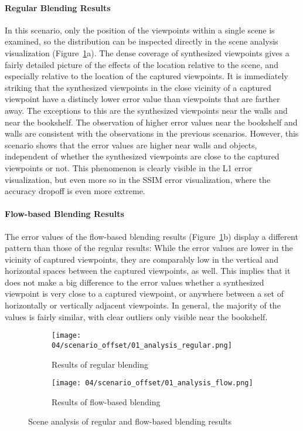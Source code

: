\paragraph{Regular Blending Results}
In this scenario, only the position of the viewpoints within a single scene is examined, so the distribution can be inspected directly in the scene analysis visualization (Figure~\ref{fig:offset_regular_flow}a). The dense coverage of synthesized viewpoints gives a fairly detailed picture of the effects of the location relative to the scene, and especially relative to the location of the captured viewpoints. It is immediately striking that the synthesized viewpoints in the close vicinity of a captured viewpoint have a distincly lower error value than viewpoints that are farther away. The exceptions to this are the synthesized viewpoints near the walls and near the bookshelf. The observation of higher error values near the bookshelf and walls are consistent with the observations in the previous scenarios. However, this scenario shows that the error values are higher near walls and objects, independent of whether the synthesized viewpoints are close to the captured viewpoints or not. This phenomenon is clearly visible in the L1 error visualization, but even more so in the SSIM error visualization, where the accuracy dropoff is even more extreme. 


\paragraph{Flow-based Blending Results}
The error values of the flow-based blending results (Figure~\ref{fig:offset_regular_flow}b) display a different pattern than those of the regular results: While the error values are lower in the vicinity of captured viewpoints, they are comparably low in the vertical and horizontal spaces between the captured viewpoints, as well. This implies that it does not make a big difference to the error values whether a synthesized viewpoint is very close to a captured viewpoint, or anywhere between a set of horizontally or vertically adjacent viewpoints. In general, the majority of the values is fairly similar, with clear outliers only visible near the bookshelf.

\begin{figure}
\centering
    \hfill
    \begin{subfigure}[b]{0.45\textwidth}
            \centering
            \texttt{[image: 04/scenario\_offset/01\_analysis\_regular.png]}
            \caption{Results of regular blending}
    \end{subfigure}
    \hfill
    \begin{subfigure}[b]{0.45\textwidth}
            \centering
            \texttt{[image: 04/scenario\_offset/01\_analysis\_flow.png]}
            \caption{Results of flow-based blending}
    \end{subfigure}
    \hfill
  \caption{Scene analysis of regular and flow-based blending results} \label{fig:offset_regular_flow}
\end{figure}

